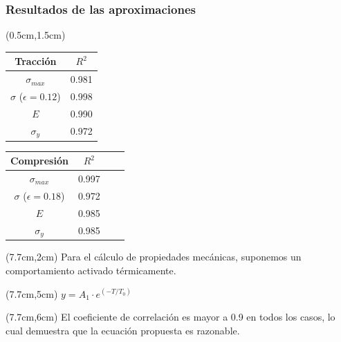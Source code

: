 \begin{frame}
 \frametitle{Resultados de las aproximaciones}
 \begin{textblock*}{6cm}(0.5cm,1.5cm) 
    
    \begin{table}[htp]
    \begin{center}
    \begin{tabular}{c c}
    \hline
    \textbf{Tracci\'on} & $R^{2}$ \\ \hline \hline
    $\sigma_{max}$ &  0.981 \\ \hline
    $\sigma$ ($\epsilon=0.12$) & 0.998 \\ \hline
    $E$ & 0.990 \\ \hline
    $\sigma_{y}$ &  0.972 \\ \hline
    \end{tabular}
    \end{center}
    \end{table}

    \begin{table}[htp]
    \begin{center}
    \begin{tabular}{*{4}{c}}
    \hline
    \textbf{Compresi\'on} & $R^{2}$ \\ \hline \hline
    $\sigma_{max}$ & 0.997 \\ \hline
    $\sigma$ ($\epsilon=0.18$) & 0.972 \\ \hline
    $E$ & 0.985 \\ \hline
    $\sigma_{y}$ & 0.985 \\ \hline
    \end{tabular}
    \end{center}
    \end{table}
 \end{textblock*}
  \begin{textblock*}{4.8cm}(7.7cm,2cm)
  \centering
   Para el c\'alculo de propiedades mec\'anicas, suponemos un comportamiento activado t\'ermicamente.
   \end{textblock*}
   \begin{textblock*}{4.8cm}(7.7cm,5cm)
   \centering
    $y=A_1\cdot e^{(-T/T_0)}$
    \end{textblock*}
  \begin{textblock*}{4.8cm}(7.7cm,6cm)
  \centering
   El coeficiente de correlaci\'on es mayor a 0.9 en todos los casos, lo cual demuestra que la ecuaci\'on propuesta es razonable.
  \end{textblock*}
\end{frame}

